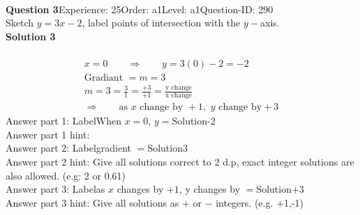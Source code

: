 \documentclass{article}
\begin{document}
\\[4pt]
\noindent\textbf{Question 3}\hspace{20pt}Experience: 25\hspace{20pt}Order: a1\hspace{20pt}Level: a1\hspace{20pt}Question-ID: 290\\[2pt]
Sketch $y=3x-2$, label points of intersection with the $y-$axis.\\[4pt]
\noindent\textbf{Solution 3}\\[2pt]
\\[-35pt]\begin{align*}
&x=0\qquad\Rightarrow\qquad y=3(0)-2=-2&\\[2pt]
&\text{Gradiant}\,\,=m=3&\\[2pt]
&m=3=\displaystyle\frac{3}{1}=\displaystyle\frac{+3}{+1}=\displaystyle\frac{\text{y change}}{\text{x change}}&\\[2pt]
& \Rightarrow\qquad \text{as}\,\, x \,\,\text{change by } +1,\,\, y\,\, \text{change by} +3 &
\end{align*}
Answer part 1: \hspace{10pt}Label\hspace{10pt}When $x=0$, $y=$\hspace{10pt}Solution\hspace{10pt}-2\\
Answer part 1 hint: \hspace{15pt}\\
Answer part 2: \hspace{10pt}Label\hspace{10pt}gradient $=$\hspace{10pt}Solution\hspace{10pt}3\\
Answer part 2 hint: \hspace{15pt}Give all solutions correct to 2 d.p, exact integer solutions are also allowed. (e.g: 2 or 0.61)\\
Answer part 3: \hspace{10pt}Label\hspace{10pt}as $x$ changes by $+1$, y changes by $=$\hspace{10pt}Solution\hspace{10pt}+3\\
Answer part 3 hint: \hspace{15pt}Give all solutions as $+$ or $-$ integers. (e.g. +1,-1)\\
\\[4pt]
\end{document}

